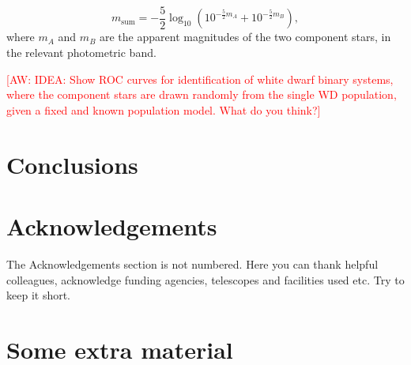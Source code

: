 \documentclass[fleqn,usenatbib]{mnras}
\newcommand{\aw}[1]{\textcolor{red}{[AW: #1]}}
\begin{document}
\begin{equation}
	m_\text{sum} = - \frac{5}{2}\log_{10}\left( 10^{-\frac{5}{2}m_{A}}+10^{-\frac{5}{2}m_{B}}  \right),
\end{equation}
where $m_A$ and $m_B$ are the apparent magnitudes of the two component stars, in the relevant photometric band.

\aw{IDEA: Show ROC curves for identification of white dwarf binary systems, where the component stars are drawn randomly from the single WD population, given a fixed and known population model. What do you think?}









\section{Conclusions}








\section*{Acknowledgements}

The Acknowledgements section is not numbered. Here you can thank helpful
colleagues, acknowledge funding agencies, telescopes and facilities used etc.
Try to keep it short.








\appendix

\section{Some extra material}




\bsp	%
\label{lastpage}
\end{document}

